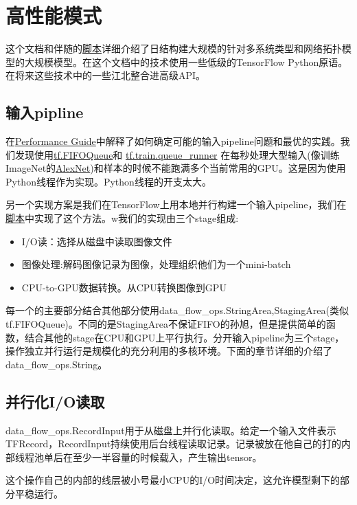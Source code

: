 \section{高性能模式}
这个文档和伴随的\href{https://github.com/tensorflow/benchmarks/tree/master/scripts/tf_cnn_benchmarks}{脚本}详细介绍了日结构建大规模的针对多系统类型和网络拓扑模型的大规模模型。在这个文档中的技术使用一些低级的TensorFlow Python原语。在将来这些技术中的一些江北整合进高级API。
\subsection{输入pipline}
在\href{https://www.tensorflow.org/performance/performance_guide}{Performance Guide}中解释了如何确定可能的输入pipeline问题和最优的实践。我们发现使用\href{https://www.tensorflow.org/api_docs/python/tf/FIFOQueue}{tf.FIFOQueue}和 \href{https://www.tensorflow.org/api_docs/python/tf/train/queue_runner}{tf.train.queue\_runner} 在每秒处理大型输入(像训练ImageNet的\href{http://papers.nips.cc/paper/4824-imagenet-classification-with-deep-convolutional-neural-networks.pdf}{AlexNet})和样本的时候不能跑满多个当前常用的GPU。这是因为使用Python线程作为实现。Python线程的开支太大。

另一个实现方案是我们在TensorFlow上用本地并行构建一个输入pipeline，我们在 \href{https://github.com/tensorflow/benchmarks/tree/master/scripts/tf_cnn_benchmarks}{脚本}中实现了这个方法。w我们的实现由三个stage组成:
\begin{itemize}
\item I/O读：选择从磁盘中读取图像文件
\item 图像处理:解码图像记录为图像，处理组织他们为一个mini-batch
\item CPU-to-GPU数据转换。从CPU转换图像到GPU
\end{itemize}
每一个的主要部分结合其他部分使用data\_flow\_ops.StringArea,StagingArea(类似tf.FIFOQueue)。不同的是StagingArea不保证FIFO的孙旭，但是提供简单的函数，结合其他的stage在CPU和GPU上平行执行。分开输入pipeline为三个stage，操作独立并行运行是规模化的充分利用的多核环境。下面的章节详细的介绍了data\_flow\_ops.String。
\subsection{并行化I/O读取}
data\_flow\_ops.RecordInput用于从磁盘上并行化读取。给定一个输入文件表示TFRecord，RecordInput持续使用后台线程读取记录。记录被放在他自己的打的内部线程池单后在至少一半容量的时候载入，产生输出tensor。

这个操作自己的内部的线层被小号最小CPU的I/O时间决定，这允许模型剩下的部分平稳运行。

